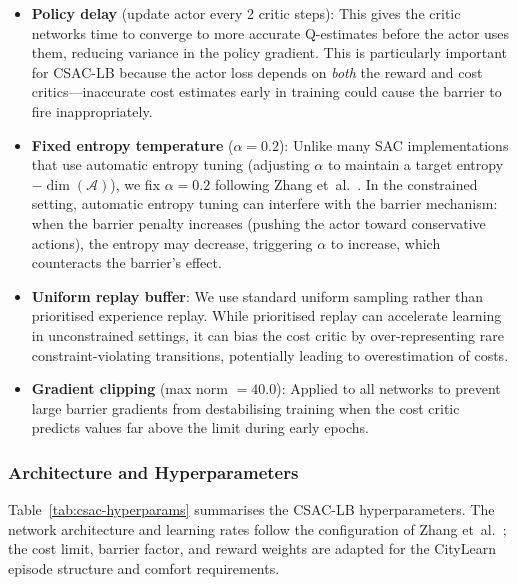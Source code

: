 \begin{itemize}
  \item \textbf{Policy delay} (update actor every 2 critic steps): This gives
    the critic networks time to converge to more accurate Q-estimates before
    the actor uses them, reducing variance in the policy gradient.  This is
    particularly important for CSAC-LB because the actor loss depends on
    \emph{both} the reward and cost critics---inaccurate cost estimates early
    in training could cause the barrier to fire inappropriately.

  \item \textbf{Fixed entropy temperature} ($\alpha = 0.2$): Unlike many SAC
    implementations that use automatic entropy tuning (adjusting $\alpha$ to
    maintain a target entropy $-\dim(\mathcal{A})$), we fix $\alpha = 0.2$
    following Zhang et~al.~\cite{zhang2024csaclb}.  In the constrained
    setting, automatic entropy tuning can interfere with the barrier mechanism:
    when the barrier penalty increases (pushing the actor toward conservative
    actions), the entropy may decrease, triggering $\alpha$ to increase, which
    counteracts the barrier's effect.

  \item \textbf{Uniform replay buffer}: We use standard uniform sampling rather
    than prioritised experience replay.  While prioritised replay can
    accelerate learning in unconstrained settings, it can bias the cost critic
    by over-representing rare constraint-violating transitions, potentially
    leading to overestimation of costs.

  \item \textbf{Gradient clipping} (max norm $= 40.0$): Applied to all
    networks to prevent large barrier gradients from destabilising training
    when the cost critic predicts values far above the limit during early
    epochs.
\end{itemize}

\subsubsection{Architecture and Hyperparameters}

Table~\ref{tab:csac-hyperparams} summarises the CSAC-LB hyperparameters.
The network architecture and learning rates follow the configuration of
Zhang et~al.~\cite{zhang2024csaclb}; the cost limit, barrier factor, and
reward weights are adapted for the CityLearn episode structure and comfort
requirements.

